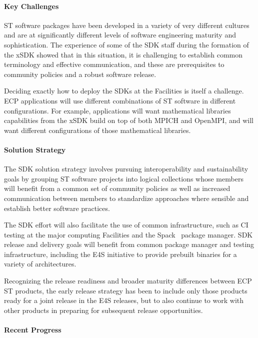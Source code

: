 \paragraph{Key  Challenges}
ST software packages have been developed in a variety of very different cultures and are at significantly different levels of software engineering maturity and sophistication. The experience of some of the SDK staff during the formation of the xSDK showed that in this situation, it is challenging to establish common terminology and effective communication, and these are prerequisites to community policies and a robust software release.

Deciding exactly how to deploy the SDKs at the Facilities is itself a challenge. ECP applications will use different combinations of ST software in different configurations. For example, applications will want mathematical libraries capabilities from the xSDK build on top of both MPICH and OpenMPI, and will want different configurations of those mathematical libraries.

\paragraph{Solution Strategy}
The SDK solution strategy involves pursuing interoperability and sustainability goals by grouping ST software projects into logical collections whose members will benefit from a common set of community policies as well as increased communication between members to standardize approaches where sensible and establish better software practices. 

The SDK effort will also facilitate the use of common infrastructure, such as CI testing at the major computing Facilities and the Spack~\cite{gamblin+:sc15} package manager. SDK release and delivery goals will benefit from common package manager and testing infrastructure, including the E4S initiative to provide prebuilt binaries for a variety of architectures.

Recognizing the release readiness and broader maturity differences between ECP ST products, the early release strategy has been to include only those products ready for a joint release in the E4S releases, but to also continue to work with other products in preparing for subsequent release opportunities.

\paragraph{Recent Progress}

